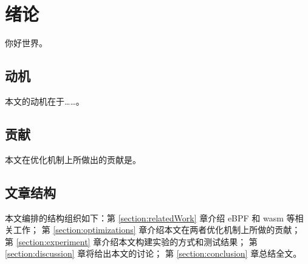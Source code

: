 \section{绪论}
    你好世界。
\subsection{动机}
    本文的动机在于……。
\subsection{贡献}
    本文在优化机制上所做出的贡献是。
\subsection{文章结构}
    本文编排的结构组织如下：第 \ref{section:relatedWork} 章介绍 eBPF 和 wasm 等相关工作；
    第 \ref{section:optimizations} 章介绍本文在两者优化机制上所做的贡献；
    第 \ref{section:experiment} 章介绍本文构建实验的方式和测试结果；
    第 \ref{section:discussion} 章将给出本文的讨论；
    第 \ref{section:conclusion} 章总结全文。
